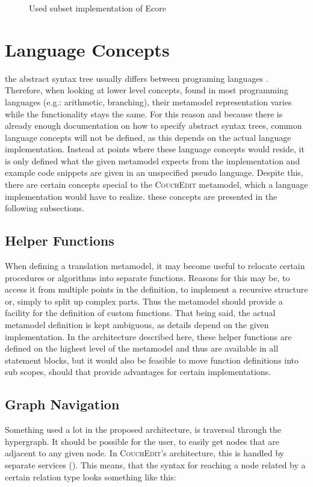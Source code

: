 \begin{figure}
  \centering
  
  \caption{Used subset implementation of Ecore}
  \label{fig:csd-abstractsyntax}
\end{figure}


\section{Language Concepts}
\label{sec:language-concepts}
the abstract syntax tree usually differs between programing languages . Therefore, when looking at lower level concepts, found in most programming languages (e.g.: arithmetic, branching), their metamodel representation varies while the functionality stays the same. For this reason and because there is already enough documentation on how to specify abstract syntax trees, common language concepts will not be defined, as this depends on the actual language implementation. Instead at points where these language concepts would reside, it is only defined what the given metamodel expects from the implementation and example code snippets are given in an unspecified pseudo language. Despite this, there are certain concepts special to the \textsc{CouchEdit} metamodel, which a language implementation would have to realize. these concepts are presented in the following subsections.


\subsection{Helper Functions}
When defining a translation metamodel, it may become useful to relocate certain procedures or algorithms into separate functions. Reasons for this may be, to access it from multiple points in the definition, to implement a recursive structure or, simply to split up complex parts. Thus the metamodel should provide a facility for the definition of custom functions. That being said, the actual metamodel definition is kept ambiguous, as details depend on the given implementation. In the architecture described here, these helper functions are defined on the highest level of the metamodel and thus are available in all statement blocks, but it would also be feasible to move function definitions into sub scopes, should that provide advantages for certain implementations.

\subsection{Graph Navigation}
\label{sec:abstraction}
Something used a lot in the proposed architecture, is traversal through the hypergraph. It should be possible for the user, to easily get nodes that are adjacent to any given node. In \textsc{CouchEdit}'s architecture, this is handled by separate services (). This means, that the syntax for reaching a node related by a certain relation type looks something like this:

